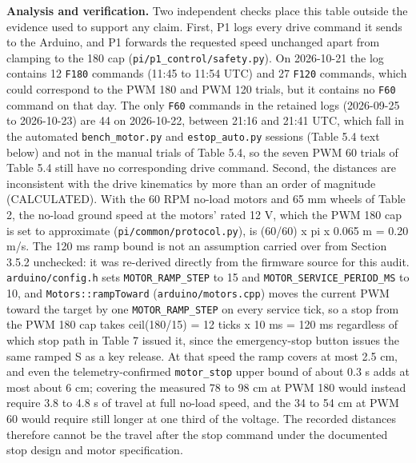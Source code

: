 \textbf{Analysis and verification.} Two independent checks place this table outside the evidence used to support any claim. First, P1 logs every drive command it sends to the Arduino, and P1 forwards the requested speed unchanged apart from clamping to the 180 cap (\texttt{pi/p1\_control/safety.py}). On 2026-10-21 the log contains 12 \texttt{F180} commands (11:45 to 11:54 UTC) and 27 \texttt{F120} commands, which could correspond to the PWM 180 and PWM 120 trials, but it contains no \texttt{F60} command on that day. The only \texttt{F60} commands in the retained logs (2026-09-25 to 2026-10-23) are 44 on 2026-10-22, between 21:16 and 21:41 UTC, which fall in the automated \texttt{bench\_motor.py} and \texttt{estop\_auto.py} sessions (Table 5.4 text below) and not in the manual trials of Table 5.4, so the seven PWM 60 trials of Table 5.4 still have no corresponding drive command. Second, the distances are inconsistent with the drive kinematics by more than an order of magnitude (CALCULATED). With the 60 RPM no-load motors and 65 mm wheels of Table 2, the no-load ground speed at the motors' rated 12 V, which the PWM 180 cap is set to approximate (\texttt{pi/common/protocol.py}), is (60/60) x pi x 0.065 m = 0.20 m/s. The 120 ms ramp bound is not an assumption carried over from Section 3.5.2 unchecked: it was re-derived directly from the firmware source for this audit. \texttt{arduino/config.h} sets \texttt{MOTOR\_RAMP\_STEP} to 15 and \texttt{MOTOR\_SERVICE\_PERIOD\_MS} to 10, and \texttt{Motors::rampToward} (\texttt{arduino/motors.cpp}) moves the current PWM toward the target by one \texttt{MOTOR\_RAMP\_STEP} on every service tick, so a stop from the PWM 180 cap takes ceil(180/15) = 12 ticks x 10 ms = 120 ms regardless of which stop path in Table 7 issued it, since the emergency-stop button issues the same ramped S as a key release. At that speed the ramp covers at most 2.5 cm, and even the telemetry-confirmed \texttt{motor\_stop} upper bound of about 0.3 s adds at most about 6 cm; covering the measured 78 to 98 cm at PWM 180 would instead require 3.8 to 4.8 s of travel at full no-load speed, and the 34 to 54 cm at PWM 60 would require still longer at one third of the voltage. The recorded distances therefore cannot be the travel after the stop command under the documented stop design and motor specification.

